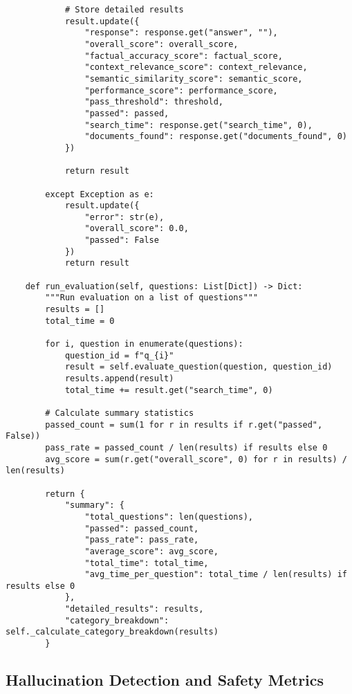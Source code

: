 \begin{verbatim}
            # Store detailed results
            result.update({
                "response": response.get("answer", ""),
                "overall_score": overall_score,
                "factual_accuracy_score": factual_score,
                "context_relevance_score": context_relevance,
                "semantic_similarity_score": semantic_score,
                "performance_score": performance_score,
                "pass_threshold": threshold,
                "passed": passed,
                "search_time": response.get("search_time", 0),
                "documents_found": response.get("documents_found", 0)
            })

            return result

        except Exception as e:
            result.update({
                "error": str(e),
                "overall_score": 0.0,
                "passed": False
            })
            return result

    def run_evaluation(self, questions: List[Dict]) -> Dict:
        """Run evaluation on a list of questions"""
        results = []
        total_time = 0

        for i, question in enumerate(questions):
            question_id = f"q_{i}"
            result = self.evaluate_question(question, question_id)
            results.append(result)
            total_time += result.get("search_time", 0)

        # Calculate summary statistics
        passed_count = sum(1 for r in results if r.get("passed", False))
        pass_rate = passed_count / len(results) if results else 0
        avg_score = sum(r.get("overall_score", 0) for r in results) / len(results)

        return {
            "summary": {
                "total_questions": len(questions),
                "passed": passed_count,
                "pass_rate": pass_rate,
                "average_score": avg_score,
                "total_time": total_time,
                "avg_time_per_question": total_time / len(results) if results else 0
            },
            "detailed_results": results,
            "category_breakdown": self._calculate_category_breakdown(results)
        }
\end{verbatim}

\subsection{Hallucination Detection and Safety Metrics}

